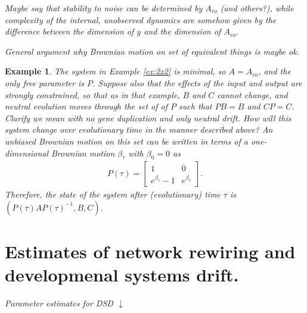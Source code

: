 \documentclass[11 pt]{article}
\newcommand{\plr}[1]{{\color{blue}\it #1}}
\newcommand{\jss}[1]{{\color{olive}\it #1}}
\newcommand{\ro}{{ro}}
\newcommand{\nro}{{\bar{r}o}}
\newtheorem{example}{Example}
\begin{document}
\plr{Maybe say that stability to noise can be determined by $A_\nro$ (and others?),
while complexity of the internal, unobserved dynamics
are somehow given by the difference between the dimension of $y$ and the dimension of $A_\ro$.}

\plr{General argument why Brownian motion on set of equivalent things is maybe ok.}

\begin{example}
    The system in Example \ref{ex:2x2} is minimal, so $A=A_\ro$,
    and the only free parameter is $P$.
    Suppose also that the effects of the input and output are strongly constrained,
    so that as in that example,
    $B$ and $C$ cannot change,
    and neutral evolution moves through the set of of $P$ such that $PB=B$ and $CP=C$.
    \plr{Clarify we mean with no gene duplication and only neutral drift.}
    How will this system change over evolutionary time in the manner described \plr{above}?
    An unbiased Brownian motion on this set 
    can be written in terms of a one-dimensional Brownian motion $\beta_\tau$ 
    with $\beta_0=0$ as
    \begin{align*}
        P(\tau) = \left[
            \begin{array}{cc}
                1 & 0 \\
                e^{\beta_\tau}-1 & e^{\beta_\tau}
            \end{array}
            \right] .
    \end{align*}
    Therefore, the state of the system after (evolutionary) time $\tau$
    is $(P(\tau)AP(\tau)^{-1},B,C)$.
\end{example}

\section{Estimates of network rewiring and developmenal systems drift.} \label{sec:param}

\jss{Parameter estimates for DSD $\downarrow$}
\end{document}
